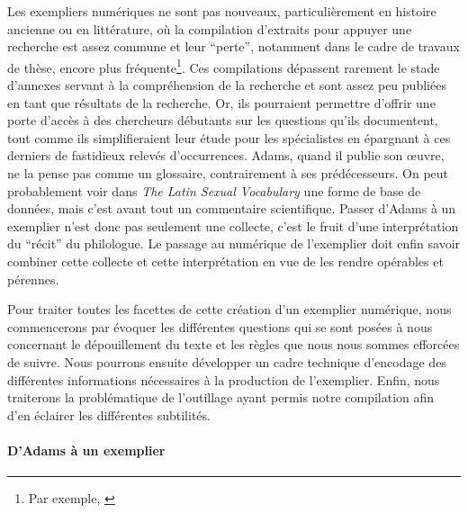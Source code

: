 Les exempliers numériques ne sont pas nouveaux, particulièrement en histoire ancienne ou en littérature, où la compilation d'extraits pour appuyer une recherche est assez commune et leur \enquote{perte}, notamment dans le cadre de travaux de thèse, encore plus fréquente\footnote{Par exemple, \textcite{castelli__2020, montreuil_histoire_2016}}. Ces compilations dépassent rarement le stade d'annexes servant à la compréhension de la recherche et sont assez peu publiées en tant que résultats de la recherche. Or, ils pourraient permettre d'offrir une porte d'accès à des chercheurs débutants sur les questions qu'ils documentent, tout comme ils simplifieraient leur étude pour les spécialistes en épargnant à ces derniers de fastidieux relevés d'occurrences. Adams, quand il publie son œuvre, ne la pense pas comme un glossaire, contrairement à ses prédécesseurs. On peut probablement voir dans \textit{The Latin Sexual Vocabulary} une forme de base de données, mais c'est avant tout un commentaire scientifique. Passer d'Adams à un exemplier n'est donc pas seulement une collecte, c'est le fruit d'une interprétation du \enquote{récit} du philologue. Le passage au numérique de l'exemplier doit enfin savoir combiner cette collecte et cette interprétation en vue de les rendre opérables et pérennes.

Pour traiter toutes les facettes de cette création d'un exemplier numérique, nous commencerons par évoquer les différentes questions qui se sont posées à nous concernant le dépouillement du texte et les règles que nous nous sommes efforcées de suivre. Nous pourrons ensuite développer un cadre technique d'encodage des différentes informations nécessaires à la production de l'exemplier. Enfin, nous traiterons la problématique de l'outillage ayant permis notre compilation afin d'en éclairer les différentes subtilités.

\paragraph{D'Adams à un exemplier}

